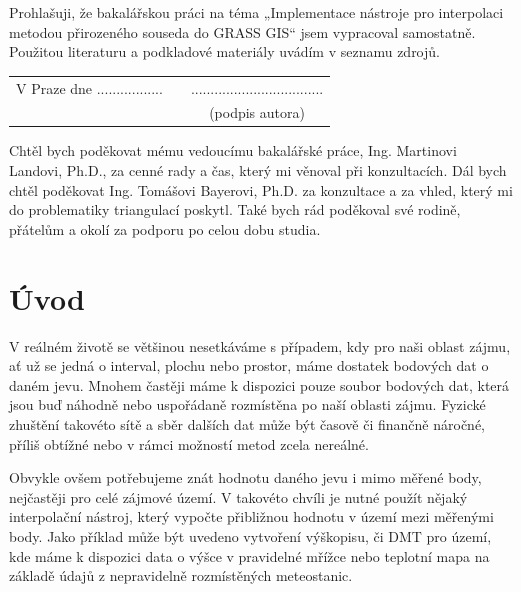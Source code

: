 \documentclass[12pt,a4paper]{article}
\newcommand{\necislovana}[1]{%
\phantomsection
\addcontentsline{toc}{section}{#1}



\section*{#1}
\markboth{\uppercase{#1}}{}
}
\begin{document}
\newcommand{\odsaditodzhora}{\hskip1pt\vfill}
\newpage
\odsaditodzhora
{}

Prohlašuji, že bakalářskou práci na téma „Implementace nástroje pro
interpolaci metodou přirozeného souseda do GRASS GIS“ jsem vypracoval
samostatně. Pou\-žitou literaturu a podkladové materiály uvádím v
seznamu zdrojů.


\begin{flushleft}
\begin{tabular}{cp{}c}
V Praze dne .................
& 
&
..................................
\\
&&
(podpis autora)
\end{tabular}

\end{flushleft}
\newpage

\odsaditodzhora
{}

Chtěl bych poděkovat mému vedoucímu bakalářské práce, Ing. Martinovi
Landovi, Ph.D., za cenné rady a čas, který mi věnoval při
konzultacích. Dál bych chtěl poděkovat Ing. Tomášovi Bayerovi, Ph.D. za konzultace a za vhled, který mi do problematiky triangulací poskytl. Také bych rád poděkoval své rodině, přátelům a okolí za
podporu po celou dobu studia.

\newpage
\tableofcontents

\newpage
\pagestyle{fancy}

\necislovana{Úvod} 

V reálném životě se většinou nesetkáváme s
případem, kdy pro naši oblast zájmu, ať už se jedná o interval, plochu
nebo prostor, máme dostatek bodových dat o daném jevu. Mnohem častěji
máme k dispozici pouze soubor bodových dat, která jsou buď náhodně
nebo uspořádaně rozmístěna po naší oblasti zájmu. Fyzické zhuštění
takovéto sítě a sběr dalších dat může být časově či finančně náročné,
příliš obtížné nebo v rámci možností metod zcela nereálné.

Obvykle ovšem potřebujeme znát hodnotu daného jevu i mimo měřené body,
nejčastěji pro celé zájmové území. V takovéto chvíli je nutné použít
nějaký interpolační nástroj, který vypočte přibližnou hodnotu v území
mezi měřenými body. Jako příklad může být uvedeno vytvoření výškopisu,
či DMT pro území, kde máme k dispozici data o výšce v pravidelné
mřížce nebo teplotní mapa na základě údajů z nepravidelně rozmístěných
meteostanic.
\end{document}
